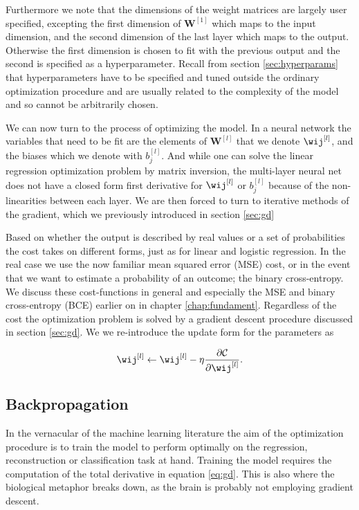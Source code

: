 \noindent Furthermore we note that the dimensions of the weight matrices are largely user specified, excepting the first dimension of $\mathbf{W}^{[1]}$ which maps to the input dimension, and the second dimension of the last layer which maps to the output. Otherwise the first dimension is chosen to fit with the previous output and the second is specified as a hyperparameter. Recall from section \ref{sec:hyperparams} that hyperparameters have to be specified and tuned outside the ordinary optimization procedure and are usually related to the complexity of the model and so cannot be arbitrarily chosen. 

We can now turn to the process of optimizing the model. In a neural network the variables that need to be fit are the elements of $\mathbf{W}^{[l]}$ that we denote $\wij^{[l]}$, and the biases which we denote with $b_j^{[l]}$. And while one can solve the linear regression optimization problem by matrix inversion, the multi-layer neural net does not have a closed form first derivative for $\wij^{[l]}$ or  $b_j^{[l]}$ because of the non-linearities between each layer. We are then forced to turn to iterative methods of the gradient, which we previously introduced in section \ref{sec:gd}

Based on whether the output is described by real values or a set of probabilities the cost takes on different forms, just as for linear and logistic regression. In the real case we use the now familiar mean squared error (MSE) cost, or in the event that we want to estimate a probability of an outcome; the binary cross-entropy. We discuss these cost-functions in general and especially the MSE and binary cross-entropy (BCE) earlier on in chapter \ref{chap:fundament}. Regardless of the cost the optimization problem is solved by a gradient descent procedure discussed in section \ref{sec:gd}. We we re-introduce the update form for the parameters as 

\begin{equation}\label{eq:gd}
	\wij^{[l]} \leftarrow \wij^{[l]} -\eta \frac{\partial \mathcal{C}}{\partial \wij^{[l]}} .
\end{equation}

\subsection{Backpropagation}\label{sec:backpropagation}

In the vernacular of the machine learning literature the aim of the optimization procedure is to train the model to perform optimally on the regression, reconstruction or classification task at hand. Training the model requires the computation of the total derivative in equation \ref{eq:gd}. This is also where the biological metaphor breaks down, as the brain is probably not employing gradient descent.

